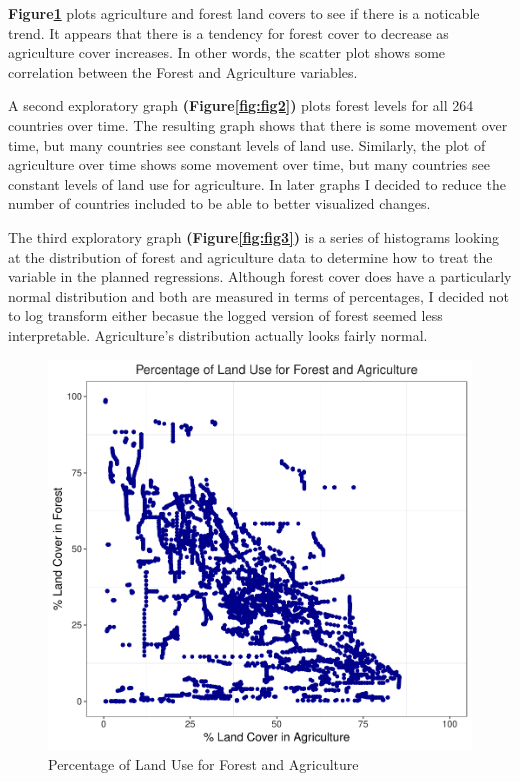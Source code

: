 \documentclass[12pt,]{article}
\begin{document}
\textbf{Figure\ref{fig:fig1}} plots agriculture and forest land covers
to see if there is a noticable trend. It appears that there is a
tendency for forest cover to decrease as agriculture cover increases. In
other words, the scatter plot shows some correlation between the Forest
and Agriculture variables.

A second exploratory graph \textbf{(Figure\ref{fig:fig2})} plots forest
levels for all 264 countries over time. The resulting graph shows that
there is some movement over time, but many countries see constant levels
of land use. Similarly, the plot of agriculture over time shows some
movement over time, but many countries see constant levels of land use
for agriculture. In later graphs I decided to reduce the number of
countries included to be able to better visualized changes.

The third exploratory graph \textbf{(Figure\ref{fig:fig3})} is a series
of histograms looking at the distribution of forest and agriculture data
to determine how to treat the variable in the planned regressions.
Although forest cover does have a particularly normal distribution and
both are measured in terms of percentages, I decided not to log
transform either becasue the logged version of forest seemed less
interpretable. Agriculture's distribution actually looks fairly normal.

\begin{figure}
\centering
\includegraphics{Marx_ENV872_Project_files/figure-latex/fig1-1.pdf}
\caption{\label{fig:fig1}Percentage of Land Use for Forest and
Agriculture}
\end{figure}
\end{document}
